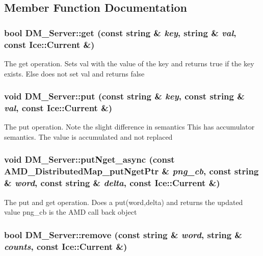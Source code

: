 \subsection{Member Function Documentation}
\hypertarget{class_d_m___server_ae440379cb66a3725c1fd7666e6287fa1}{
\subsubsection[{get}]{\setlength{\rightskip}{0pt plus 5cm}bool DM\_\-Server::get (const string \& {\em key}, \/  string \& {\em val}, \/  const Ice::Current \&)}}
\label{class_d_m___server_ae440379cb66a3725c1fd7666e6287fa1}
The get operation. Sets val with the value of the key and returns true if the key exists. Else does not set val and returns false \hypertarget{class_d_m___server_a2ef825954e6bfea85484800642f93136}{
\subsubsection[{put}]{\setlength{\rightskip}{0pt plus 5cm}void DM\_\-Server::put (const string \& {\em key}, \/  const string \& {\em val}, \/  const Ice::Current \&)}}
\label{class_d_m___server_a2ef825954e6bfea85484800642f93136}
The put operation. Note the slight difference in semantics This has accumulator semantics. The value is accumulated and not replaced \hypertarget{class_d_m___server_ad90ade02956d09234831cf7edd61fff5}{
\subsubsection[{putNget\_\-async}]{\setlength{\rightskip}{0pt plus 5cm}void DM\_\-Server::putNget\_\-async (const AMD\_\-DistributedMap\_\-putNgetPtr \& {\em png\_\-cb}, \/  const string \& {\em word}, \/  const string \& {\em delta}, \/  const Ice::Current \&)}}
\label{class_d_m___server_ad90ade02956d09234831cf7edd61fff5}
The put and get operation. Does a put(word,delta) and returns the updated value png\_\-cb is the AMD call back object \hypertarget{class_d_m___server_af60a2b4c3d5f5bfaceaa09797ecf54f8}{
\subsubsection[{remove}]{\setlength{\rightskip}{0pt plus 5cm}bool DM\_\-Server::remove (const string \& {\em word}, \/  string \& {\em counts}, \/  const Ice::Current \&)}}
